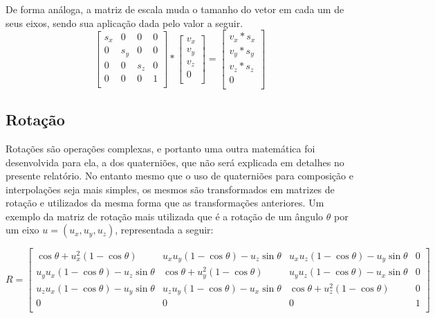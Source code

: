 De forma análoga, a matriz de escala muda o tamanho do vetor em cada um de seus eixos, sendo sua aplicação dada pelo valor a seguir.
\begin{equation}
\begin{bmatrix}
    s_x & 0   & 0   & 0\\
    0   & s_y & 0   & 0\\
    0   & 0   & s_z & 0\\
    0   & 0   & 0   & 1 \\
\end{bmatrix}
*
\begin{bmatrix}
    v_x\\
    v_y\\
    v_z\\
    0 \\
\end{bmatrix}
=
\begin{bmatrix}
    v_x * s_x\\
    v_y * s_y\\
    v_z * s_z\\
    0 \\
\end{bmatrix}
\end{equation}


\subsection{Rotação}

Rotações são operações complexas, e portanto uma outra matemática foi desenvolvida para ela, a dos quaterniões, que não será explicada em detalhes no presente relatório. No entanto mesmo que o uso de quaterniões para composição e interpolações seja mais simples, os mesmos são transformados em matrizes de rotação e utilizados da mesma forma que as transformações anteriores. Um exemplo da matriz de rotação mais utilizada que é a rotação de um ângulo $\theta$ por um eixo $u = (u_x, u_y, u_z)$, representada a seguir:

\begin{equation}
R = 
\begin{bmatrix}
    \cos\theta + u_x^2(1-\cos\theta) & u_x u_y (1-\cos\theta) - u_z \sin\theta & u_x u_z (1-\cos\theta) - u_y \sin\theta & 0 \\
     u_y u_x (1-\cos\theta) - u_z \sin\theta   & \cos\theta + u_y^2(1-\cos\theta) & u_y u_z (1-\cos\theta) - u_x \sin\theta    & 0\\
     u_z u_x (1-\cos\theta) - u_y \sin\theta &  u_z u_y (1-\cos\theta) - u_x \sin\theta & \cos\theta + u_z^2(1-\cos\theta)  & 0\\
    0   & 0   & 0   & 1 \\
\end{bmatrix}
\end{equation}


